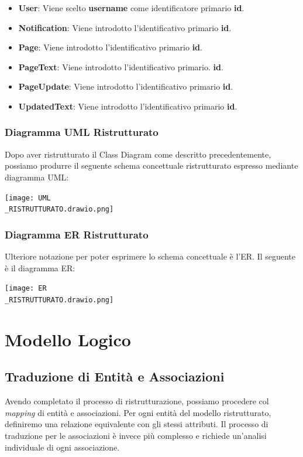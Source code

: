 \documentclass{article}
\begin{document}
{	\begin{itemize}
		\item \textbf{User}: Viene scelto \textbf{username} come identificatore primario \textbf{id}.
		\item \textbf{Notification}: Viene introdotto l'identificativo primario \textbf{id}.
		\item \textbf{Page}: Viene introdotto l'identificativo primario \textbf{id}.
		\item \textbf{PageText}: Viene introdotto l'identificativo primario. \textbf{id}.
		\item \textbf{PageUpdate}: Viene introdotto l'identificativo primario \textbf{id}.
		\item \textbf{UpdatedText}: Viene introdotto l'identificativo primario \textbf{id}.
	\end{itemize}


	\newpage

	\subsubsection{Diagramma UML Ristrutturato}
	Dopo aver ristrutturato il Class Diagram come descritto precedentemente, possiamo produrre il seguente schema concettuale ristrutturato espresso mediante diagramma UML:
	
	\begin{center}
		\texttt{[image: UML\\\_RISTRUTTURATO.drawio.png]}
	\end{center}
	
	\newpage
	
	\subsubsection{Diagramma ER Ristrutturato}
	Ulteriore notazione per poter esprimere lo schema concettuale \`e l’ER. Il seguente \`e il diagramma ER:
	
	\begin{center}
		\texttt{[image: ER\\\_RISTRUTTURATO.drawio.png]}
	\end{center}
	
	
	\newpage
	
	\section{Modello Logico}
	
	\subsection{Traduzione di Entit\`a e Associazioni}
	Avendo completato il processo di ristrutturazione, possiamo procedere col \textit{mapping} di entit\`a e associazioni. Per ogni entit\`a del modello ristrutturato, definiremo una relazione equivalente con gli stessi attributi. Il processo di traduzione per le associazioni \`e invece pi\`u complesso e richiede un’analisi individuale di ogni associazione.
	
}
\end{document}
